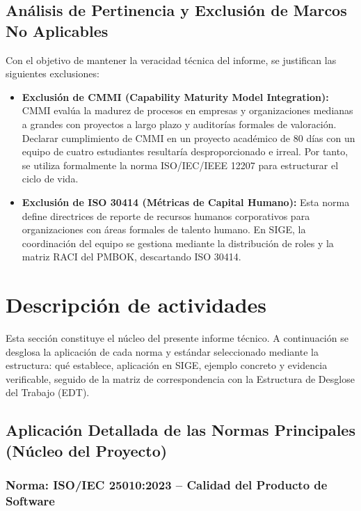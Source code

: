 \documentclass[12pt,a4paper]{article}
\begin{document}
\subsection{Análisis de Pertinencia y Exclusión de Marcos No Aplicables}
Con el objetivo de mantener la veracidad técnica del informe, se justifican las siguientes exclusiones:
\begin{itemize}[leftmargin=1.5em, itemsep=2pt]
    \item \textbf{Exclusión de CMMI (Capability Maturity Model Integration):} CMMI evalúa la madurez de procesos en empresas y organizaciones medianas a grandes con proyectos a largo plazo y auditorías formales de valoración. Declarar cumplimiento de CMMI en un proyecto académico de 80 días con un equipo de cuatro estudiantes resultaría desproporcionado e irreal. Por tanto, se utiliza formalmente la norma ISO/IEC/IEEE 12207 para estructurar el ciclo de vida.
    \item \textbf{Exclusión de ISO 30414 (Métricas de Capital Humano):} Esta norma define directrices de reporte de recursos humanos corporativos para organizaciones con áreas formales de talento humano. En SIGE, la coordinación del equipo se gestiona mediante la distribución de roles y la matriz RACI del PMBOK, descartando ISO 30414.
\end{itemize}

\section{Descripción de actividades}

Esta sección constituye el núcleo del presente informe técnico. A continuación se desglosa la aplicación de cada norma y estándar seleccionado mediante la estructura: qué establece, aplicación en SIGE, ejemplo concreto y evidencia verificable, seguido de la matriz de correspondencia con la Estructura de Desglose del Trabajo (EDT).

\subsection{Aplicación Detallada de las Normas Principales (Núcleo del Proyecto)}

\subsubsection{Norma: ISO/IEC 25010:2023 -- Calidad del Producto de Software}
\end{document}
